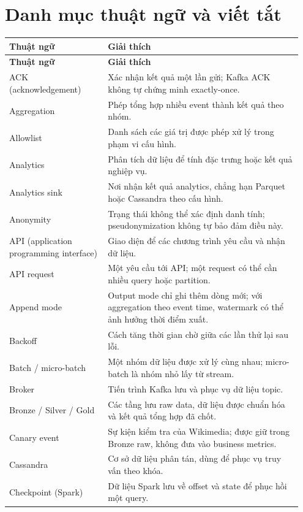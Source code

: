 \chapter*{Danh mục thuật ngữ và viết tắt}
\small
\begin{longtable}{@{}p{0.32\linewidth}p{0.63\linewidth}@{}}
\toprule
\textbf{Thuật ngữ} & \textbf{Giải thích} \\
\midrule
\endfirsthead
\toprule
\textbf{Thuật ngữ} & \textbf{Giải thích} \\
\midrule
\endhead
ACK (acknowledgement) & Xác nhận kết quả một lần gửi; Kafka ACK không tự chứng minh exactly-once. \\
Aggregation & Phép tổng hợp nhiều event thành kết quả theo nhóm. \\
Allowlist & Danh sách các giá trị được phép xử lý trong phạm vi cấu hình. \\
Analytics & Phân tích dữ liệu để tính đặc trưng hoặc kết quả nghiệp vụ. \\
Analytics sink & Nơi nhận kết quả analytics, chẳng hạn Parquet hoặc Cassandra theo cấu hình. \\
Anonymity & Trạng thái không thể xác định danh tính; pseudonymization không tự bảo đảm điều này. \\
API (application programming interface) & Giao diện để các chương trình yêu cầu và nhận dữ liệu. \\
API request & Một yêu cầu tới API; một request có thể cần nhiều query hoặc partition. \\
Append mode & Output mode chỉ ghi thêm dòng mới; với aggregation theo event time, watermark có thể ảnh hưởng thời điểm xuất. \\
Backoff & Cách tăng thời gian chờ giữa các lần thử lại sau lỗi. \\
Batch / micro-batch & Một nhóm dữ liệu được xử lý cùng nhau; micro-batch là nhóm nhỏ lấy từ stream. \\
Broker & Tiến trình Kafka lưu và phục vụ dữ liệu topic. \\
Bronze / Silver / Gold & Các tầng lưu raw data, dữ liệu được chuẩn hóa và kết quả tổng hợp đã chốt. \\
Canary event & Sự kiện kiểm tra của Wikimedia; được giữ trong Bronze raw, không đưa vào business metrics. \\
Cassandra & Cơ sở dữ liệu phân tán, dùng để phục vụ truy vấn theo khóa. \\
Checkpoint (Spark) & Dữ liệu Spark lưu về offset và state để phục hồi một query. \\

\end{longtable}
